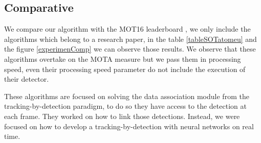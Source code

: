 \subsection{Comparative}

%

We compare our algorithm with the MOT16 leaderboard \cite{motResults}, we only include the algorithms which belong to a research paper, in the table \ref{tableSOTatomeu} and the figure \ref{experimenComp} we can observe those results. We observe that these algorithms overtake on the MOTA measure but we pass them in processing speed, even their processing speed parameter do not include the execution of their detector.

These algorithms are focused on solving the data association module from the tracking-by-detection paradigm, to do so they have access to the detection at each frame. They worked on how to link those detections. Instead, we were focused on how to develop a tracking-by-detection with neural networks on real time.
 

